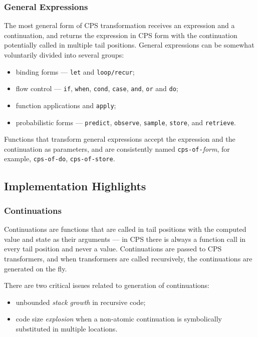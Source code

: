 \documentclass[a4paper]{article}
\begin{document}
\subsubsection{General Expressions}

The most general form of CPS transformation receives an
expression and a continuation, and returns the expression
in CPS form with the continuation potentially called in multiple
tail positions. General expressions can be somewhat voluntarily
divided into several groups:
\begin{itemize}
	\item binding forms --- \texttt{let} and
		\texttt{loop/recur};
	\item flow control --- \texttt{if}, \texttt{when},
		\texttt{cond}, \texttt{case}, \texttt{and}, \texttt{or} and \texttt{do};
	\item function applications and \texttt{apply};
	\item probabilistic forms --- \texttt{predict},
		\texttt{observe}, \texttt{sample}, \texttt{store}, and \texttt{retrieve}.
\end{itemize}
Functions that transform general expressions accept the
expression and the continuation as parameters, and are
consistently named \texttt{cps-of-}\textit{form}, for example,
\texttt{cps-of-do}, \texttt{cps-of-store}.

\subsection{Implementation Highlights}

\subsubsection{Continuations}

Continuations are functions that are called in tail positions
with the computed value and state as their arguments --- in CPS
there is always a function call in every tail position and never
a value. Continuations are passed to CPS transformers, and when
transformers are called recursively, the continuations are
generated on the fly. 

There are two critical issues related to generation of
continuations:
\begin{itemize}
	\item unbounded \textit{stack growth} in recursive code;
	\item code size \textit{explosion} when a non-atomic
		continuation is symbolically substituted in multiple
		locations.
\end{itemize}
		
\end{document}
